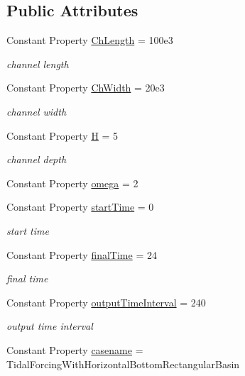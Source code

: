 \subsection*{Public Attributes}
\begin{DoxyCompactItemize}
\item 
Constant Property \hyperlink{class_open_channel3d_a6d829ad6501499ee3cc2122164ed3ff2}{Ch\+Length} = 100e3
\begin{DoxyCompactList}\small\item\em channel length \end{DoxyCompactList}\item 
Constant Property \hyperlink{class_open_channel3d_a7e606ae3ce4132c49184d2252ec5642d}{Ch\+Width} = 20e3
\begin{DoxyCompactList}\small\item\em channel width \end{DoxyCompactList}\item 
Constant Property \hyperlink{class_open_channel3d_a326dedeb4a7503cc6b028460e33680a3}{H} = 5
\begin{DoxyCompactList}\small\item\em channel depth \end{DoxyCompactList}\item 
Constant Property \hyperlink{class_open_channel3d_ae068e1b972f9f51e49767bb23d166804}{omega} = 2
\item 
Constant Property \hyperlink{class_open_channel3d_a6fed2187810c042b20d1830cced71668}{start\+Time} = 0
\begin{DoxyCompactList}\small\item\em start time \end{DoxyCompactList}\item 
Constant Property \hyperlink{class_open_channel3d_a7d9472d8232552edc47bb487df119dc6}{final\+Time} = 24
\begin{DoxyCompactList}\small\item\em final time \end{DoxyCompactList}\item 
Constant Property \hyperlink{class_open_channel3d_ac61988aca3f0fd6165fa22be5ca52ab9}{output\+Time\+Interval} = 240
\begin{DoxyCompactList}\small\item\em output time interval \end{DoxyCompactList}\item 
Constant Property \hyperlink{class_open_channel3d_a11ad49cbe382d4c92db26b035a2e6293}{casename} = \textquotesingle{}Tidal\+Forcing\+With\+Horizontal\+Bottom\+Rectangular\+Basin\textquotesingle{}

\end{DoxyCompactItemize}
